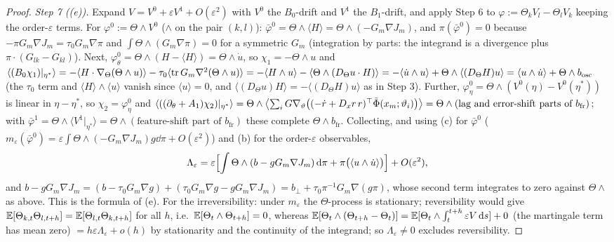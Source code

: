\begin{proof}
\smallskip
\emph{Step 7 ((e)).} Expand $V = V^0 + \varepsilon V^1 + O(\varepsilon^2)$ with $V^0$ the $B_0$-drift and $V^1$ the
$B_1$-drift, and apply Step 6 to $\varphi := \Theta_kV_l - \Theta_lV_k$ keeping the order-$\varepsilon$ terms. For
$\varphi^0 := \Theta\wedge V^0$ ($\wedge$ on the pair $(k,l)$):
$\bar\varphi^0 = \Theta\wedge\langle H\rangle = \Theta\wedge(-G_m\nabla J_m)$, and $\pi(\bar\varphi^0) = 0$ because
$-\pi G_m\nabla J_m = \tau_0G_m\nabla\pi$ and $\int\Theta\wedge(G_m\nabla\pi) = 0$ for a symmetric $G_m$ (integration
by parts: the integrand is a divergence plus $\pi\cdot(G_{lk} - G_{kl})$). Next,
$\varphi^0_\theta = \Theta\wedge(H - \langle H\rangle) = \Theta\wedge\dot u$, so $\chi_1 = -\Theta\wedge u$ and
$\langle(B_0\chi_1)|_{\eta^*}\rangle = -\langle H\cdot\nabla_\Theta(\Theta\wedge u)\rangle
- \tau_0\langle\operatorname{tr} G_m\nabla^2(\Theta\wedge u)\rangle = -\langle H\wedge u\rangle - \langle\Theta\wedge(D_\Theta u\cdot H)\rangle
= -\langle\dot u\wedge u\rangle + \Theta\wedge\langle(D_\Theta H)u\rangle = \langle u\wedge\dot u\rangle + \Theta\wedge b_{\mathrm{osc}}$
(the $\tau_0$ term and $\langle H\rangle\wedge\langle u\rangle$ vanish since $\langle u\rangle = 0$, and
$\langle(D_\Theta u)H\rangle = -\langle(D_\Theta H)u\rangle$ as in Step 3). Further,
$\varphi^0_\eta = \Theta\wedge(V^0(\eta) - V^0(\eta^*))$ is linear in $\eta - \eta^*$, so $\chi_2 = \varphi^0_\eta$
and $\langle((\partial_\theta + A_1)\chi_2)|_{\eta^*}\rangle
= \Theta\wedge\bigl\langle\sum_iG\nabla_\vartheta\bigl((-\dot r + D_xr\,r)^\top\tilde\Phi(x_m;\vartheta_i)\bigr)\bigr\rangle
= \Theta\wedge(\text{lag and error-shift parts of }b_{\mathrm{fr}})$; with
$\bar\varphi^1 = \Theta\wedge\langle V^1|_{\eta^*}\rangle = \Theta\wedge(\text{feature-shift part of }b_{\mathrm{fr}})$
these complete $\Theta\wedge b_{\mathrm{fr}}$. Collecting, and using (c) for $\bar\varphi^0$
($m_\varepsilon(\bar\varphi^0) = \varepsilon\int\Theta\wedge(-G_m\nabla J_m)g\dd\pi + O(\varepsilon^2)$) and (b) for
the order-$\varepsilon$ observables,
\[
  \Lambda_\varepsilon = \varepsilon\Bigl[\int\Theta\wedge(b - gG_m\nabla J_m)\,\mathrm{d}\pi + \pi\bigl(\langle u\wedge\dot u\rangle\bigr)\Bigr]
  + O(\varepsilon^2),
\]
and $b - gG_m\nabla J_m = (b - \tau_0G_m\nabla g) + (\tau_0G_m\nabla g - gG_m\nabla J_m) = b_\perp + \tau_0\pi^{-1}G_m\nabla(g\pi)$,
whose second term integrates to zero against $\Theta\wedge$ as above. This is the formula of (e). For the
irreversibility: under $m_\varepsilon$ the $\Theta$-process is stationary; reversibility would give
$\mathbb{E}[\Theta_{k,t}\Theta_{l,t+h}] = \mathbb{E}[\Theta_{l,t}\Theta_{k,t+h}]$ for all $h$, i.e.\ $\mathbb{E}[\Theta_t\wedge\Theta_{t+h}] = 0$,
whereas $\mathbb{E}[\Theta_t\wedge(\Theta_{t+h} - \Theta_t)] = \mathbb{E}[\Theta_t\wedge\int_t^{t+h}\varepsilon V\,\mathrm{d} s] + 0$ (the
martingale term has mean zero) $= h\varepsilon\Lambda_\varepsilon + o(h)$ by stationarity and the continuity of the
integrand; so $\Lambda_\varepsilon\ne0$ excludes reversibility.
\end{proof}

